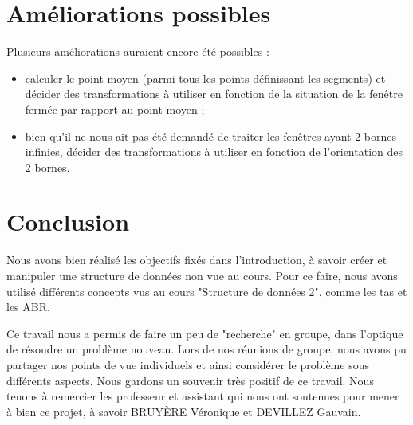 \documentclass[10pt,a4paper]{article}
\begin{document}
\section{Améliorations possibles}
Plusieurs améliorations auraient encore été possibles :
\begin{itemize}
	\item calculer le point moyen (parmi tous les points définissant les segments) et décider des transformations à utiliser en fonction de la situation de la fenêtre fermée par rapport au point moyen ;
	\item bien qu'il ne nous ait pas été demandé de traiter les fenêtres ayant 2 bornes infinies, décider des transformations à utiliser en fonction de l'orientation des 2 bornes.
\end{itemize}

\section{Conclusion}
Nous avons bien réalisé les objectifs fixés dans l'introduction, à savoir créer et manipuler une structure de données non vue au cours. Pour ce faire, nous avons utilisé différents concepts vus au cours "Structure de données 2", comme les tas et les ABR.

Ce travail nous a permis de faire un peu de "recherche" en groupe, dans l'optique de résoudre un problème nouveau. Lors de nos réunions de groupe, nous avons pu partager nos points de vue individuels et ainsi considérer le problème sous différents aspects. Nous gardons un souvenir très positif de ce travail. Nous tenons à remercier les professeur et assistant qui nous ont soutenues pour mener à bien ce projet, à savoir BRUYÈRE Véronique et DEVILLEZ Gauvain.
\end{document}

